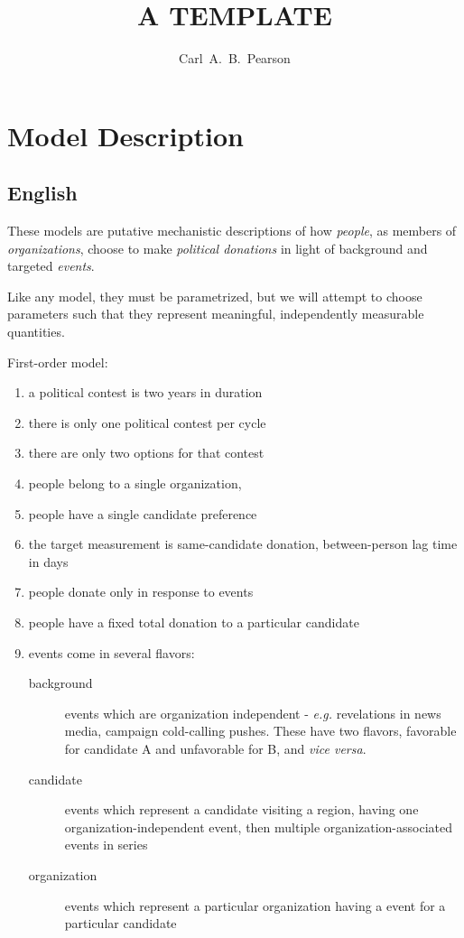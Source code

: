 \documentclass{article}
\author{Carl~A.~B.~Pearson}
\begin{document}

\title{A TEMPLATE}

\titlepage

\section{Model Description}
\subsection{English}
These models are putative mechanistic descriptions of how {\em people}, as members of {\em organizations}, choose to make {\em political donations} in light of background and targeted {\em events}.

Like any model, they must be parametrized, but we will attempt to choose parameters such that they represent meaningful, independently measurable quantities.

First-order model:
\begin{enumerate}
\item a political contest is two years in duration
\item there is only one political contest per cycle
\item there are only two options for that contest
\item people belong to a single organization,
\item people have a single candidate preference
\item the target measurement is same-candidate donation, between-person lag time in days
\item people donate only in response to events
\item people have a fixed total donation to a particular candidate
\item events come in several flavors:\begin{description}
  \item[background] events which are organization independent - {\em e.g.} revelations in news media, campaign cold-calling pushes.  These have two flavors, favorable for candidate A and unfavorable for B, and {\em vice versa}.
  \item[candidate] events which represent a candidate visiting a region, having one organization-independent event, then multiple organization-associated events in series
  \item[organization] events which represent a particular organization having a event for a particular candidate
\end{description}
\end{enumerate}
\end{document}
